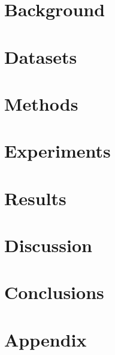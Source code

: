 \documentclass[a4paper, 11pt]{memoir}
\begin{document}
\chapter{Background} \label{cha:2_related_work}

\cleardoublepage

\chapter{Datasets} \label{cha:3_datasets}

\cleardoublepage

\chapter{Methods} \label{cha:4_methods}

\cleardoublepage

\chapter{Experiments} \label{cha:5_experiments}

\cleardoublepage

\chapter{Results} \label{cha:5_results}

\cleardoublepage

\chapter{Discussion} \label{cha:6_discussion}

\cleardoublepage

\chapter{Conclusions} \label{cha:7_conclusions}

\cleardoublepage


\backmatter
\appendix

\chapter{Appendix} \label{cha:appendix}




\end{document}
